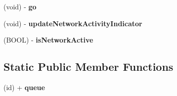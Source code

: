 \begin{DoxyCompactItemize}
\item 
\hypertarget{interface_a_s_i_network_queue_abeaa1ecbfc31ec7ae8082ff8394f7b9b}{
(void) -\/ {\bfseries go}}
\label{interface_a_s_i_network_queue_abeaa1ecbfc31ec7ae8082ff8394f7b9b}

\item 
\hypertarget{interface_a_s_i_network_queue_a78614c992056f2ab1941c94eb7106e0c}{
(void) -\/ {\bfseries updateNetworkActivityIndicator}}
\label{interface_a_s_i_network_queue_a78614c992056f2ab1941c94eb7106e0c}

\item 
\hypertarget{interface_a_s_i_network_queue_ab885ce42fa4f857f58923ae1c73fbbe6}{
(BOOL) -\/ {\bfseries isNetworkActive}}
\label{interface_a_s_i_network_queue_ab885ce42fa4f857f58923ae1c73fbbe6}

\end{DoxyCompactItemize}
\subsection*{Static Public Member Functions}
\begin{DoxyCompactItemize}
\item 
\hypertarget{interface_a_s_i_network_queue_af2b6cbcf9ce67a2480aeb8114a142941}{
(id) + {\bfseries queue}}
\label{interface_a_s_i_network_queue_af2b6cbcf9ce67a2480aeb8114a142941}

\end{DoxyCompactItemize}
